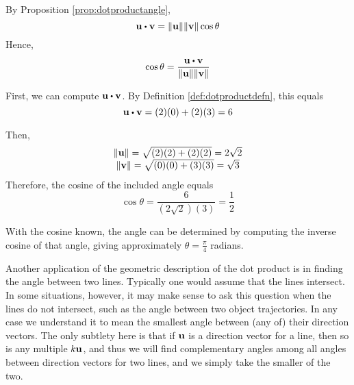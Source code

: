 \begin{solution}
By Proposition \ref{prop:dotproductangle},
\begin{equation*}
\vect{u}\dotprod \vect{v}=\vectlength \vect{u}\vectlength \vectlength \vect{v}
\vectlength \cos \theta 
\end{equation*}
Hence, 
\begin{equation*}
\cos \theta =\frac{\vect{u}\dotprod \vect{v}}{\vectlength \vect{u}\vectlength \vectlength \vect{v}
\vectlength}
\end{equation*}
 
First, we can compute $\vect{u}\dotprod \vect{v}$. By Definition \ref{def:dotproductdefn}, this equals
\begin{equation*}
\vect{u}\dotprod \vect{v}
=
(2)(0) + (2)(3) = 6
\end{equation*}

Then, 
\begin{equation*}
\begin{array}{c}
\| {\bf u} \|
=
\sqrt{(2)(2)+(2)(2)}=2\sqrt{2}\\
\|  {\bf v} \|
=
\sqrt{(0)(0)+(3)(3)}=\sqrt{3}
\end{array}
\end{equation*}
 Therefore, the cosine of the included angle equals
\begin{equation*}
\cos \theta =\frac{6}{(2\sqrt{2})(3)}=\frac{1}{2}
\end{equation*}

With the cosine known, the angle can be determined by computing the
inverse cosine of that angle, giving approximately  $\theta =\frac{\pi}{4}$ radians. 
\end{solution}

Another application of the geometric description of the dot product is
in finding the angle between two lines. Typically one would assume that the
lines intersect. In some situations, however, it may make sense to ask this
question when the lines do not intersect, such as the angle between
two object trajectories. In any case we understand it to mean the
smallest angle between (any of) their direction vectors. The only
subtlety here is that if ${\bf u}$ is a direction vector for a line,
then so is any multiple $k{\bf u}$, and thus we will find complementary angles
among all angles between direction vectors for two lines, and we
simply take the smaller of the two.

